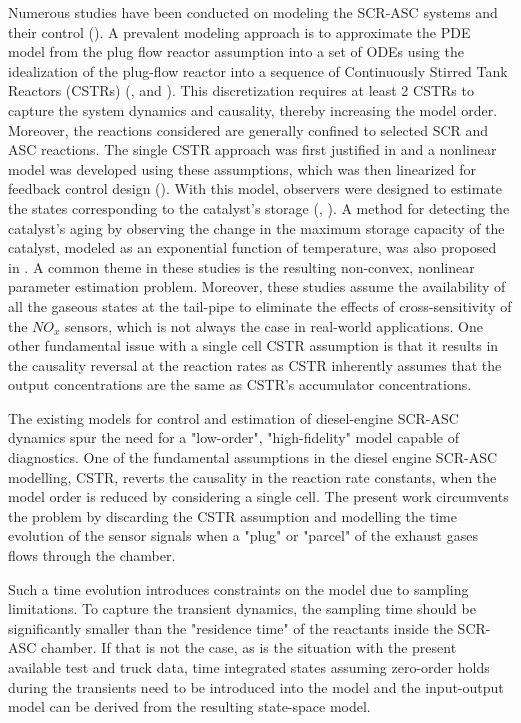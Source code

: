 Numerous studies have been conducted on modeling the SCR-ASC systems and their control (\cite{yuan2015diesel}). A
prevalent modeling approach is to approximate the PDE model from the plug flow reactor assumption into a set of ODEs
using the idealization of the plug-flow reactor into a sequence of Continuously Stirred Tank Reactors (CSTRs)
(\cite{hsieh2011development}, and \cite{nova2014urea}). This discretization requires at least 2 CSTRs to capture the
system dynamics and causality, thereby increasing the model order. Moreover, the reactions considered are generally
confined to selected SCR and ASC reactions. The single CSTR approach was first justified in
\cite{devarakonda2008adequacy} and a nonlinear model was developed using these assumptions, which was then linearized
for feedback control design (\cite{devarakonda2009model}). With this model, observers were designed to estimate the
states corresponding to the catalyst's storage (\cite{ma2017observer}, \cite{jain2020term}). A method for detecting the
catalyst's aging by observing the change in the maximum storage capacity of the catalyst, modeled as an exponential
function of temperature, was also proposed in \cite{ma2017observer}. A common theme in these studies is the resulting
non-convex, nonlinear parameter estimation problem. Moreover, these studies assume the availability of all the gaseous
states at the tail-pipe to eliminate the effects of cross-sensitivity of the $NO_x$ sensors, which is not always the
case in real-world applications. One other fundamental issue with a single cell CSTR assumption is that it results in
the causality reversal at the reaction rates as CSTR inherently assumes that the output concentrations are the same as
CSTR's accumulator concentrations.

The existing models for control and estimation of diesel-engine SCR-ASC dynamics spur the need for a "low-order",
"high-fidelity" model capable of diagnostics. One of the fundamental assumptions in the diesel engine SCR-ASC modelling,
CSTR, reverts the causality in the reaction rate constants, when the model order is reduced by considering a single
cell. The present work circumvents the problem by discarding the CSTR assumption and modelling the time evolution of the
sensor signals when a "plug" or "parcel" of the exhaust gases flows through the chamber.

Such a time evolution introduces constraints on the model due to sampling limitations. To capture the transient
dynamics, the sampling time should be significantly smaller than the "residence time" of the reactants inside the
SCR-ASC chamber. If that is not the case, as is the situation with the present available test and truck data, time
integrated states assuming zero-order holds during the transients need to be introduced into the model and the
input-output model can be derived from the resulting state-space model.

